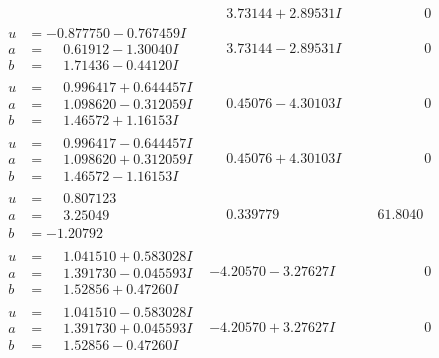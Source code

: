 \documentclass[1p]{elsarticle_modified}
\theoremstyle{definition}
\begin{document}
$$\begin{array}{c|c|c}
 & \phantom{-}3.73144 + 2.89531 I & \phantom{-0.000000 } 0 \\ \hline\begin{aligned}
u &= -0.877750 - 0.767459 I \\
a &= \phantom{-}0.61912 - 1.30040 I \\
b &= \phantom{-}1.71436 - 0.44120 I\end{aligned}
 & \phantom{-}3.73144 - 2.89531 I & \phantom{-0.000000 } 0 \\ \hline\begin{aligned}
u &= \phantom{-}0.996417 + 0.644457 I \\
a &= \phantom{-}1.098620 - 0.312059 I \\
b &= \phantom{-}1.46572 + 1.16153 I\end{aligned}
 & \phantom{-}0.45076 - 4.30103 I & \phantom{-0.000000 } 0 \\ \hline\begin{aligned}
u &= \phantom{-}0.996417 - 0.644457 I \\
a &= \phantom{-}1.098620 + 0.312059 I \\
b &= \phantom{-}1.46572 - 1.16153 I\end{aligned}
 & \phantom{-}0.45076 + 4.30103 I & \phantom{-0.000000 } 0 \\ \hline\begin{aligned}
u &= \phantom{-}0.807123\phantom{ +0.000000I} \\
a &= \phantom{-}3.25049\phantom{ +0.000000I} \\
b &= -1.20792\phantom{ +0.000000I}\end{aligned}
 & \phantom{-}0.339779\phantom{ +0.000000I} & \phantom{-}61.8040\phantom{ +0.000000I} \\ \hline\begin{aligned}
u &= \phantom{-}1.041510 + 0.583028 I \\
a &= \phantom{-}1.391730 - 0.045593 I \\
b &= \phantom{-}1.52856 + 0.47260 I\end{aligned}
 & -4.20570 - 3.27627 I & \phantom{-0.000000 } 0 \\ \hline\begin{aligned}
u &= \phantom{-}1.041510 - 0.583028 I \\
a &= \phantom{-}1.391730 + 0.045593 I \\
b &= \phantom{-}1.52856 - 0.47260 I\end{aligned}
 & -4.20570 + 3.27627 I & \phantom{-0.000000 } 0 \\ \hline\begin{aligned}

\end{aligned}
\end{array}$$
\end{document}
